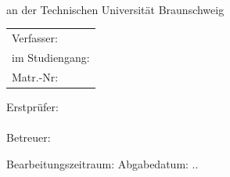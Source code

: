 \begin{titlepage}
	\begin{large}
	\begin{center}
		
		\vspace*{2.5cm}
		
		\LARGE{\textbf{\themaderarbeit}}
	\end{center}
	
	\vspace{2cm}
	
	\begin{center}
		
		\textbf{\artderausarbeitung}\\ an der Technischen Universität Braunschweig
		
		\vspace{1cm}
		
		\begin{tabular}{l}
			Verfasser: \namedesautors\\
			im Studiengang: \studiengang\\
			Matr.-Nr: \martrikelnummer
		\end{tabular}
	\end{center}
	
	\vspace{2cm}
	
	\noindent Erstprüfer:\\
		\erstpruefer \\[0.5cm]
	Betreuer:\\
		\zweitpruefer%
		

\end{large}

\vspace{\fill}

Bearbeitungszeitraum: \bearbeitungszeit  \hfill Abgabedatum: \tagderabgabe.\monatderabgabe.\jahrderabgabe
\end{titlepage}

\cleardoublepage






